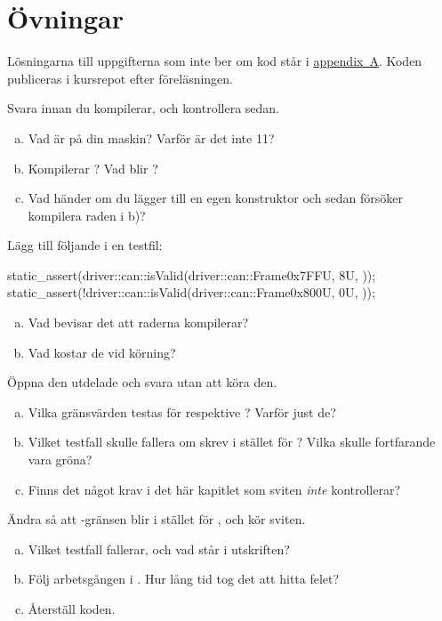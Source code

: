 \section*{Övningar}

Lösningarna till uppgifterna som inte ber om kod står i \hyperref[ch:losningar]{appendix~A}.
Koden publiceras i kursrepot efter föreläsningen.

\label{ex:5:1}
Svara innan du kompilerar, och kontrollera sedan.
\begin{enumerate}[a)]
  \item Vad är  på din maskin? Varför är det inte 11?
  \item Kompilerar ? Vad blir
    ?
  \item Vad händer om du lägger till en egen konstruktor och sedan försöker kompilera raden i b)?
\end{enumerate}

\label{ex:5:2}
Lägg till följande i en testfil:
\begin{cppcode}
static_assert(driver::can::isValid(driver::can::Frame{0x7FFU, 8U, {}}));
static_assert(!driver::can::isValid(driver::can::Frame{0x800U, 0U, {}}));
\end{cppcode}
\begin{enumerate}[a)]
  \item Vad bevisar det att raderna kompilerar?
  \item Vad kostar de vid körning?
\end{enumerate}

\label{ex:5:3}
Öppna den utdelade  och svara utan att köra den.
\begin{enumerate}[a)]
  \item Vilka gränsvärden testas för  respektive ? Varför just de?
  \item Vilket testfall skulle fallera om  skrev \code{<} i stället för
    \code{<=}? Vilka skulle fortfarande vara gröna?
  \item Finns det något krav i det här kapitlet som sviten \emph{inte} kontrollerar?
\end{enumerate}

\label{ex:5:4}
Ändra  så att -gränsen blir \code{<} i stället för \code{<=}, och kör
sviten.
\begin{enumerate}[a)]
  \item Vilket testfall fallerar, och vad står i utskriften?
  \item Följ arbetsgången i . Hur lång tid tog det att hitta felet?
  \item Återställ koden.
\end{enumerate}

